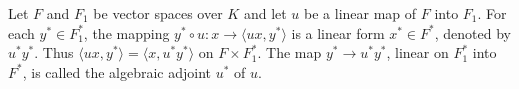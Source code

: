 Let $F$ and $F_1$ be vector spaces over $K$ and let $u$ be a linear map of $F$ into $F_1$. For each $y^* \in F_1^*$, the mapping $y^* \circ u: x \rightarrow \langle ux, y^* \rangle$ is a linear form $x^* \in F^*$, denoted by $u^*y^*$. Thus $\langle ux, y^* \rangle = \langle x, u^*y^* \rangle$ on $F \times F_1^*$. The map $y^* \rightarrow u^*y^*$, linear on $F_1^*$ into $F^*$, is called the algebraic adjoint $u^*$ of $u$.
